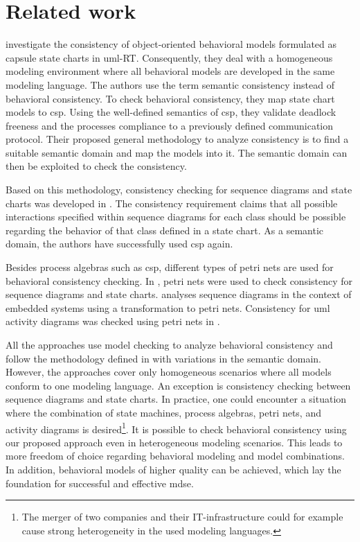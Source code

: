 \documentclass[conference]{IEEEtran}
\begin{document}
\section{Related work}
\cite{engelsMethodologySpecifyingAnalyzing2001} investigate the consistency of object-oriented behavioral models formulated as capsule state charts in \gls{uml}-RT.
Consequently, they deal with a homogeneous modeling environment where all behavioral models are developed in the same modeling language.
The authors use the term semantic consistency instead of behavioral consistency.
To check behavioral consistency, they map state chart models to \gls{csp}.
Using the well-defined semantics of \gls{csp}, they validate deadlock freeness and the processes compliance to a previously defined communication protocol.
Their proposed general methodology to analyze consistency is to find a suitable semantic domain and map the models into it.
The semantic domain can then be exploited to check the consistency.

Based on this methodology, consistency checking for sequence diagrams and state charts was developed in \cite{kusterExplicitBehavioralConsistency2003}.
The consistency requirement claims that all possible interactions specified within sequence diagrams for each class should be possible regarding the behavior of that class defined in a state chart.
As a semantic domain, the authors have successfully used \gls{csp} again.

Besides process algebras such as \gls{csp}, different types of petri nets are used for behavioral consistency checking.
In \cite{yaoConsistencyCheckingUML2006}, petri nets were used to check consistency for sequence diagrams and state charts.
\cite{cunhaFormalVerificationUML2011} analyses sequence diagrams in the context of embedded systems using a transformation to petri nets.
Consistency for \gls{uml} activity diagrams was checked using petri nets in \cite{thierry-miegUMLBehavioralConsistency2008}.

All the approaches use model checking to analyze behavioral consistency and follow the methodology defined in \cite{engelsMethodologySpecifyingAnalyzing2001} with variations in the semantic domain.
However, the approaches cover only homogeneous scenarios where all models conform to one modeling language.
An exception is consistency checking between sequence diagrams and state charts.
In practice, one could encounter a situation where the combination of state machines, process algebras, petri nets, and activity diagrams is desired\footnote{The merger of two companies and their IT-infrastructure could for example cause strong heterogeneity in the used modeling languages.}.
It is possible to check behavioral consistency using our proposed approach even in heterogeneous modeling scenarios.
This leads to more freedom of choice regarding behavioral modeling and model combinations.
In addition, behavioral models of higher quality can be achieved, which lay the foundation for successful and effective \gls{mdse}.
\end{document}
